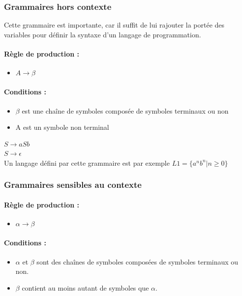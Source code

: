 \subsubsection{Grammaires hors contexte}
Cette grammaire est importante, car il suffit de lui rajouter la portée des 
variables pour définir la syntaxe d'un langage de programmation.

\paragraph{Règle de production :} 
\begin{itemize}
	\item $A \rightarrow \beta$
\end{itemize}

\paragraph{Conditions :}

\begin{itemize}
	\item  $\beta$ est une chaîne de symboles composée de symboles terminaux
	       	ou non
	\item A est un symbole non terminal
\end{itemize}

\begin{myexem}
	$S \rightarrow aSb$ \\
	$S \rightarrow \epsilon$ \\
	Un langage défini par cette grammaire est par exemple $L1 = \{a^nb^n|n 
		\geq 0\}$
\end{myexem}

\subsubsection{Grammaires sensibles au contexte}
\paragraph{Règle de production :} 
\begin{itemize}
	\item $\alpha \rightarrow \beta$
\end{itemize}

\paragraph{Conditions :}
\begin{itemize}
	\item $\alpha$ et $\beta$ sont des chaînes de symboles composées de 
		symboles terminaux ou non.
	\item $\beta$ contient au moins 
		autant de symboles que $\alpha$.
\end{itemize}

